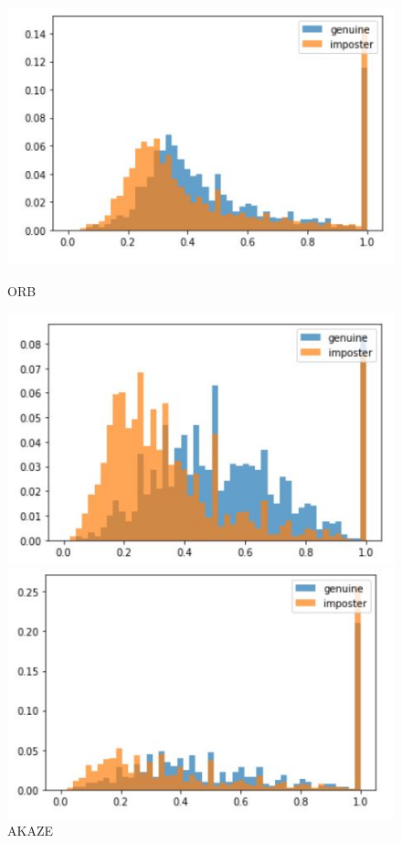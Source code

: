 \documentclass{article}
\begin{document}
\begin{figure}[!htb]
   \begin{minipage}{0.24\textwidth}
     \centering
     \includegraphics[width=1\linewidth,scale=1.2]{./imgs/orb_histogram.jpg}
     \caption{ORB}\label{Fig:Data3}
   \end{minipage}\hfill
   \begin{minipage}{0.24\textwidth}
     \centering
     \includegraphics[width=1\linewidth,scale=1.2]{./imgs/akaze_histogram.jpg}
     \caption{AKAZE}\label{Fig:Data3}
   \end{minipage}\hfill
   \begin{minipage}{0.24\textwidth}
     \centering
     \includegraphics[width=1\linewidth,scale=1.2]{./imgs/brisk_histogram.jpg}

\end{minipage}
\end{figure}
\end{document}
